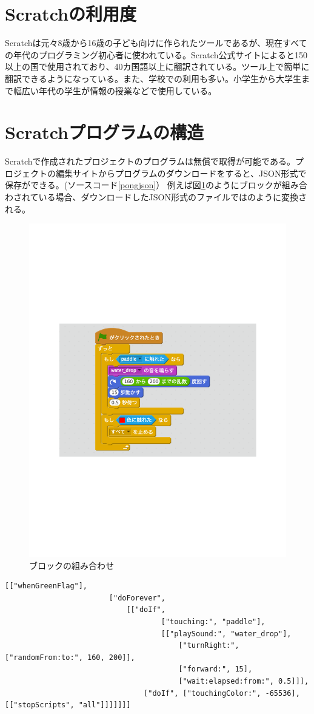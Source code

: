 \documentclass[a4paper,10pt,onecolumn,oneside,openany]{jsbook}
\begin{document}
\section{Scratchの利用度}
Scratchは元々8歳から16歳の子ども向けに作られたツールであるが、現在すべての年代のプログラミング初心者に使われている。Scratch公式サイト\cite{scratch_about}によると150以上の国で使用されており、40カ国語以上に翻訳されている。ツール上で簡単に翻訳できるようになっている。また、学校での利用も多い。小学生から大学生まで幅広い年代の学生が情報の授業などで使用している。


\section{Scratchプログラムの構造}
Scratchで作成されたプロジェクトのプログラムは無償で取得が可能である。プロジェクトの編集サイトからプログラムのダウンロードをすると、JSON形式で保存ができる。(ソースコード\ref{pongjson}）
例えば図\ref{blockcom}のようにブロックが組み合わされている場合、ダウンロードしたJSON形式のファイルでは\cite{blockjson}のように変換される。
\begin{figure}[h]
\centering
 \includegraphics[scale=0.5]{graphic/blockcom.pdf}
\caption{ブロックの組み合わせ}
\label{blockcom}
\end{figure}
 \begin{lstlisting}[caption=JSON形式に変換されたブロックの組み合わせ,label=blockjson]
	[["whenGreenFlag"],
						["doForever",
							[["doIf",
									["touching:", "paddle"],
									[["playSound:", "water_drop"],
										["turnRight:", ["randomFrom:to:", 160, 200]],
										["forward:", 15],
										["wait:elapsed:from:", 0.5]]],
								["doIf", ["touchingColor:", -65536], [["stopScripts", "all"]]]]]]]
 \end{lstlisting}
\end{document}
